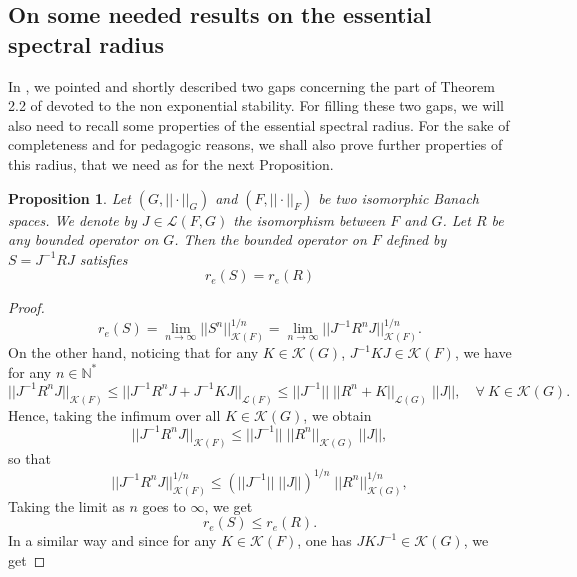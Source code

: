 \documentclass[10pt, english]{article}
\newtheorem{prop}[thm]{Proposition}
\begin{document}
{\subsection{On some needed results on the essential spectral radius}
In \cite{AB2023I}, we pointed and shortly described  two gaps concerning the part of Theorem 2.2 of \cite{SW2003} devoted to the non exponential stability.
For filling these two gaps, we will also need to recall some properties of the essential spectral radius. For the sake of completeness and for pedagogic reasons, we shall also prove further properties of this radius, that we need as for the next Proposition.
\begin{prop}\label{Inv}
Let $(G, ||\cdot||_G)$ and $(F, ||\cdot||_F)$ be two isomorphic Banach spaces. We denote by $J \in \mathcal{L}(F,G)$ the isomorphism between $F$ and $G$. Let $R$ be any bounded operator on $G$. Then the bounded operator on $F$ defined by $S=J^{-1}RJ$ satisfies
\begin{equation}\label{Iso}
r_e(S)=r_e(R)
\end{equation}
\end{prop}
\begin{proof}
\begin{equation}\label{G4.25}%
r_e(S)=\lim_{n \rightarrow \infty}||S^n||_{\mathcal{K}(F)}^{1/n}= \lim_{n \rightarrow \infty}||J^{-1}R^n J||_{\mathcal{K}(F)}^{1/n}.
\end{equation}
On the other hand, noticing that for any $K \in \mathcal{K}(G)$, $J^{-1}K J \in \mathcal{K}(F)$, we have for any $n \in \mathbb{N}^{\ast}$
\begin{equation}\label{G4.26}%
||J^{-1}R^n J||_{\mathcal{K}(F)} \leqslant || J^{-1}R^n J + J^{-1}K J||_{\mathcal{L}(F)} \leqslant ||J^{-1}||\; ||R^n +K ||_{\mathcal{L}(G)}
\;||J|| , \quad \forall \ K \in \mathcal{K}(G).
\end{equation}
Hence, taking the infimum over all $K \in \mathcal{K}(G)$, we obtain
\begin{equation}\label{G4.27}%
||J^{-1}R^n J||_{\mathcal{K}(F)} \leqslant  ||J^{-1}|| \;||R^n||_{\mathcal{K}(G)}\;||J||,
\end{equation}
so that
$$
||J^{-1}R^n J||_{\mathcal{K}(F)}^{1/n} \leqslant  (||J^{-1}||\; ||J|| )^{1/n}\; ||R^n||_{\mathcal{K}(G)}^{1/n},
$$
Taking the limit as $n$ goes to $\infty$, we get
\begin{equation}\label{G4.28}%
r_e(S) \leqslant r_e(R).
\end{equation}
In a similar way and since for any $K \in \mathcal{K}(F)$, one has $JKJ^{-1} \in \mathcal{K}(G)$, we get

\end{proof}}
\end{document}

